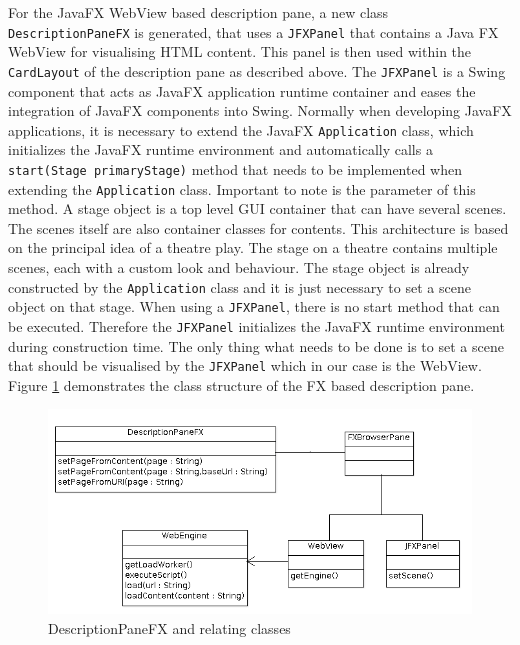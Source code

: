 For the JavaFX WebView based description pane, a new class \texttt{DescriptionPaneFX} is generated, that uses a \texttt{JFXPanel} that contains a Java FX  WebView for visualising HTML content.
This panel is then used within the \texttt{CardLayout} of the description pane as described above.
The \texttt{JFXPanel} is a Swing component that acts as JavaFX application runtime container and eases the integration of JavaFX components into Swing.
Normally when developing JavaFX applications, it is necessary to extend the JavaFX \texttt{Application} class, which initializes the JavaFX runtime environment and automatically calls a \texttt{start(Stage primaryStage)} method that needs to be implemented when extending the \texttt{Application} class.
Important to note is the parameter of this method.
A stage object is a top level GUI container that can have several scenes.
The scenes itself are also container classes for contents.
This architecture is based on the principal idea of a theatre play.
The stage on a theatre contains multiple scenes, each with a custom look and behaviour.
The stage object is already constructed by the \texttt{Application} class and it is just necessary to set a scene object on that stage.
When using a \texttt{JFXPanel}, there is no start method that can be executed.
Therefore the \texttt{JFXPanel} initializes the JavaFX runtime environment during construction time.
The only thing what needs to be done is to set a scene that should be visualised by the \texttt{JFXPanel} which in our case is the WebView.
Figure \ref{fig:class_diag_desc_pane_fx} demonstrates the class structure of the FX based description pane. 

\begin{figure}
	\centering	\includegraphics[width=1.0\textwidth]{./img/classDiagramms/desc_pane_fx.png}
	\caption{DescriptionPaneFX and relating classes}
	\label{fig:class_diag_desc_pane_fx}
\end{figure}

